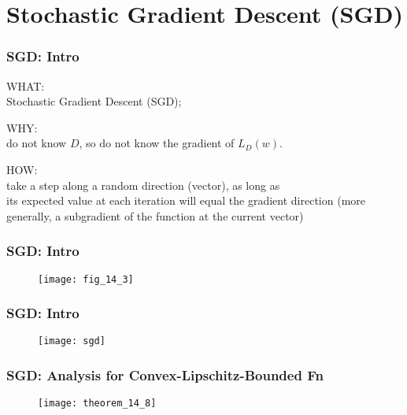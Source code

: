 \section{Stochastic Gradient Descent (SGD)}

\begin{frame}
\frametitle{SGD: Intro}

WHAT:\\
Stochastic Gradient Descent (SGD);
\vspace{5mm}

WHY:\\
do not know $D$, so do not know the gradient of $L_D(w)$.
\vspace{5mm}

HOW:\\
take a step along a random direction (vector), as long as \\
its expected value at each iteration will equal the gradient direction
(more generally, a subgradient of the function at the current vector)
\end{frame}

\begin{frame}
\frametitle{SGD: Intro}

\begin{figure}
    \centering
    \texttt{[image: fig\_14\_3]}
\end{figure}

\end{frame}

\begin{frame}
\frametitle{SGD: Intro}

\begin{figure}
    \centering
    \texttt{[image: sgd]}
\end{figure}

\end{frame}



\begin{frame}
\frametitle{SGD: Analysis for Convex-Lipschitz-Bounded Fn}

\begin{figure}
    \centering
    \texttt{[image: theorem\_14\_8]}
\end{figure}

\end{frame}
